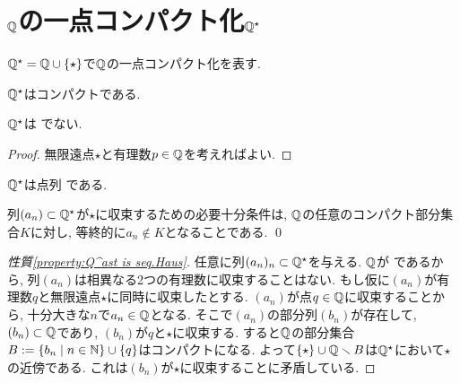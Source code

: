 \documentclass[uplatex, dvipdfmx, a4paper, 12pt, class=jsbook, crop=false]{standalone}
\begin{document}
\section{$\mathbb{Q}$の一点コンパクト化\texorpdfstring{$\mathbb{Q}^\star$}{Q\^{*}}}
\label{ex:Q-star}

\let\bigstar\star
\newcommand{\locref}[1]{\ref{LocalLabel-\thepart-\thechapter-\thesection:#1}}
\newcommand{\loclabel}[1]{\label{LocalLabel-\thepart-\thechapter-\thesection:#1}}

$ \Q^\star = \Q \cup \{\bigstar\} $で$ \mathbb{Q} $の一点コンパクト化を表す.

\begin{property}
	$ \mathbb{Q}^\star $はコンパクトである.
\end{property}

\begin{property}
	$ \mathbb{Q}^\star $は \Hausdorff でない.
\end{property}
\begin{proof}
	無限遠点$ \bigstar $と有理数$ p \in \mathbb{Q} $を考えればよい.
\end{proof}

\begin{property}
	\label{property:Q^ast is seq.Haus}
	$ \mathbb{Q}^\star $は点列 \Hausdorff である.
\end{property}
\begin{proposition}
	列$ (a_n) \subset \mathbb{Q}^\star $が$ \bigstar $に収束するための必要十分条件は, $ \mathbb{Q} $の任意のコンパクト部分集合$ K $に対し, 等終的に$ a_n \not\in K $となることである. \qed
\end{proposition}

\begin{proof}[性質\ref{property:Q^ast is seq.Haus}]
	任意に列$ (a_n)_n \subset \mathbb{Q}^\star $を与える. $ \mathbb{Q} $が \Hausdorff であるから, 列$ (a_n) $は相異なる2つの有理数に収束することはない. もし仮に$ (a_n) $が有理数$ q $と無限遠点$ \bigstar $に同時に収束したとする. $ (a_n) $が点$ q \in \mathbb{Q} $に収束することから, 十分大きな$ n $で$ a_n \in \mathbb{Q} $となる. そこで$ (a_n) $の部分列$ (b_n) $が存在して, $ (b_n) \subset \mathbb{Q} $であり, $ (b_n) $が$ q $と$ \bigstar $に収束する. すると$ \mathbb{Q} $の部分集合$ B \defeq \setcomp{b_n}{n \in \N} \cup \{q\} $はコンパクトになる. よって$ \{\bigstar\} \cup \Q \setminus B $は$ \mathbb{Q}^\star $において$ \bigstar $の近傍である. これは$ (b_n) $が$ \bigstar $に収束することに矛盾している.
\end{proof}
\end{document}
